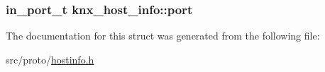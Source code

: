\subsubsection[{\texorpdfstring{port}{port}}]{\setlength{\rightskip}{0pt plus 5cm}in\+\_\+port\+\_\+t knx\+\_\+host\+\_\+info\+::port}\hypertarget{structknx__host__info_a48c44f6dca880046f25cd70d3e808735}{}\label{structknx__host__info_a48c44f6dca880046f25cd70d3e808735}


The documentation for this struct was generated from the following file\+:\begin{DoxyCompactItemize}
\item 
src/proto/\hyperlink{hostinfo_8h}{hostinfo.\+h}\end{DoxyCompactItemize}

